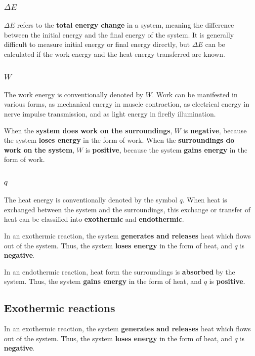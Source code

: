 \documentclass[11pt]{article}
\begin{document}
\subsubsection{\(\Delta E\)}
\label{sec:org24fe1da}
\(\Delta E\) refers to the \textbf{total energy change} in a system, meaning the difference between the initial energy and the final energy of the system. It is generally difficult to measure initial energy or final energy directly, but \(\Delta E\) can be calculated if the work energy and the heat energy transferred are known.
\subsubsection{\(W\)}
\label{sec:orgce20df6}
The work energy is conventionally denoted by \(W\). Work can be manifested in various forms, as mechanical energy in muscle contraction, as electrical energy in nerve impulse transmission, and as light energy in firefly illumination.


When the \textbf{system does work on the surroundings}, \(W\) is \textbf{negative}, because the system \textbf{loses energy} in the form of work. When the \textbf{surroundings do work on the system}, \(W\) is \textbf{positive}, because the system \textbf{gains energy} in the form of work.
\subsubsection{\(q\)}
\label{sec:org51c6635}
The heat energy is conventionally denoted by the symbol \(q\). When heat is exchanged between the system and the surroundings, this exchange or transfer of heat can be classified into \textbf{exothermic} and \textbf{endothermic}.


In an exothermic reaction, the system \textbf{generates and releases} heat which flows out of the system. Thus, the system \textbf{loses energy} in the form of heat, and \(q\) is \textbf{negative}.


In an endothermic reaction, heat form the surroundings is \textbf{absorbed} by the system. Thus, the system \textbf{gains energy} in the form of heat, and \(q\) is \textbf{positive}.
\subsection{Exothermic reactions}
\label{sec:org6c0a764}
In an exothermic reaction, the system \textbf{generates and releases} heat which flows out of the system. Thus, the system \textbf{loses energy} in the form of heat, and \(q\) is \textbf{negative}.
\end{document}
